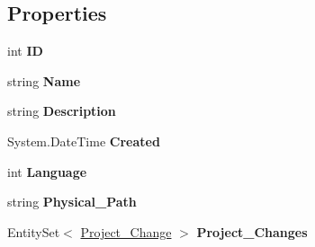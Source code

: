 \subsection*{Properties}
\begin{DoxyCompactItemize}
\item 
\hypertarget{class_k_change_logger_1_1_project_a7d68e233daec577910c8996ca9bcde55}{int {\bfseries I\-D}}\label{class_k_change_logger_1_1_project_a7d68e233daec577910c8996ca9bcde55}

\item 
\hypertarget{class_k_change_logger_1_1_project_a7ec255c1c9030d6d925fd88503dbc733}{string {\bfseries Name}}\label{class_k_change_logger_1_1_project_a7ec255c1c9030d6d925fd88503dbc733}

\item 
\hypertarget{class_k_change_logger_1_1_project_ab28db8aa4cd44fd1738eccfebb809241}{string {\bfseries Description}}\label{class_k_change_logger_1_1_project_ab28db8aa4cd44fd1738eccfebb809241}

\item 
\hypertarget{class_k_change_logger_1_1_project_a52fc4bad1dc728a03a5b57b21312939d}{System.\-Date\-Time {\bfseries Created}}\label{class_k_change_logger_1_1_project_a52fc4bad1dc728a03a5b57b21312939d}

\item 
\hypertarget{class_k_change_logger_1_1_project_a861bf2554e5e5b09928e0e32fd3753e0}{int {\bfseries Language}}\label{class_k_change_logger_1_1_project_a861bf2554e5e5b09928e0e32fd3753e0}

\item 
\hypertarget{class_k_change_logger_1_1_project_a4e8938cfb1d156466060196222b787e5}{string {\bfseries Physical\-\_\-\-Path}}\label{class_k_change_logger_1_1_project_a4e8938cfb1d156466060196222b787e5}

\item 
\hypertarget{class_k_change_logger_1_1_project_ac458aada9dfb4bb8ec5f734f88030e8a}{Entity\-Set$<$ \hyperlink{class_k_change_logger_1_1_project___change}{Project\-\_\-\-Change} $>$ {\bfseries Project\-\_\-\-Changes}}\label{class_k_change_logger_1_1_project_ac458aada9dfb4bb8ec5f734f88030e8a}


\end{DoxyCompactItemize}

